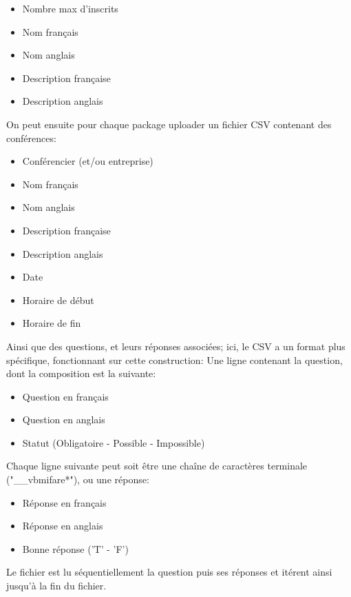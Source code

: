     \begin{itemize}
    \item Nombre max d'inscrits
    \item Nom français
    \item Nom anglais
    \item Description française
    \item Description anglais
    \end{itemize}

On peut ensuite pour chaque package uploader un fichier CSV contenant des conférences:

    \begin{itemize}
    \item Conférencier (et/ou entreprise)
    \item Nom français
    \item Nom anglais
    \item Description française
    \item Description anglais
    \item Date
    \item Horaire de début
    \item Horaire de fin
    \end{itemize}

Ainsi que des questions, et leurs réponses associées; ici, le CSV a un format plus spécifique, fonctionnant sur cette construction:
Une ligne contenant la question, dont la composition est la suivante:

    \begin{itemize}
    \item Question en français
    \item Question en anglais
    \item Statut (Obligatoire - Possible - Impossible)
    \end{itemize}

Chaque ligne suivante peut soit être une chaîne de caractères terminale ("\_\_vbmifare*"), ou une réponse:

    \begin{itemize}
    \item Réponse en français
    \item Réponse en anglais
    \item Bonne réponse ('T' - 'F')
    \end{itemize}

Le fichier est lu séquentiellement la question puis ses réponses et itérent ainsi jusqu'à la fin du fichier.

